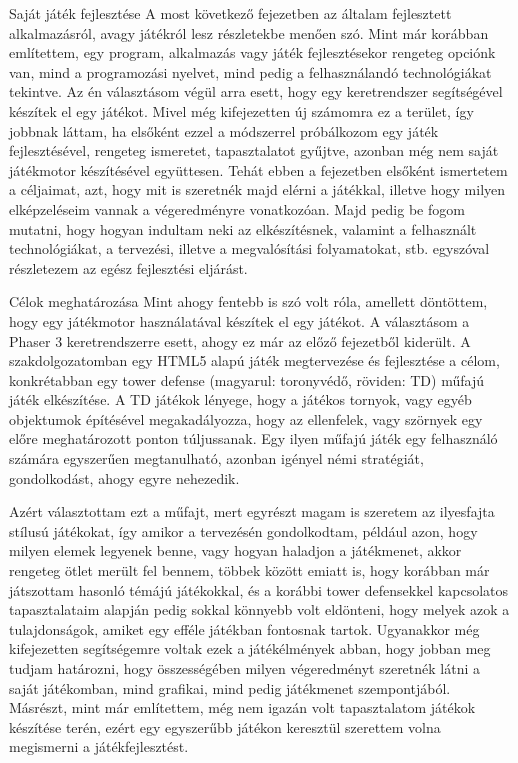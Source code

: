 \begin{MyChapter}{Saját játék fejlesztése}
	A most következő fejezetben az általam fejlesztett alkalmazásról, avagy játékról lesz részletekbe menően szó. Mint már korábban említettem, egy program, alkalmazás vagy játék fejlesztésekor rengeteg opciónk van, mind a programozási nyelvet, mind pedig a felhasználandó technológiákat tekintve. Az én választásom végül arra esett, hogy egy keretrendszer segítségével készítek el egy játékot. Mivel még kifejezetten új számomra ez a terület, így jobbnak láttam, ha elsőként ezzel a módszerrel próbálkozom egy játék fejlesztésével, rengeteg ismeretet, tapasztalatot gyűjtve, azonban még nem saját játékmotor készítésével együttesen.
	Tehát ebben a fejezetben elsőként ismertetem a céljaimat, azt, hogy mit is szeretnék majd elérni a játékkal, illetve hogy milyen elképzeléseim vannak a végeredményre vonatkozóan. Majd pedig be fogom mutatni, hogy hogyan indultam neki az elkészítésnek, valamint a felhasznált technológiákat, a tervezési, illetve a megvalósítási folyamatokat, stb. egyszóval részletezem az egész fejlesztési eljárást.
	
	\begin{MySection}{Célok meghatározása}
		Mint ahogy fentebb is szó volt róla, amellett döntöttem, hogy egy játékmotor használatával készítek el egy játékot. A választásom a Phaser 3 keretrendszerre esett, ahogy ez már az előző fejezetből kiderült.
		A szakdolgozatomban egy HTML5 alapú játék megtervezése és fejlesztése a célom, konkrétabban egy tower defense (magyarul: toronyvédő, röviden: TD) műfajú játék elkészítése. A TD játékok lényege, hogy a játékos tornyok, vagy egyéb objektumok építésével megakadályozza, hogy az ellenfelek, vagy szörnyek egy előre meghatározott ponton túljussanak. Egy ilyen műfajú játék egy felhasználó számára egyszerűen megtanulható, azonban igényel némi stratégiát, gondolkodást, ahogy egyre nehezedik. 
		
		Azért választottam ezt a műfajt, mert egyrészt magam is szeretem az ilyesfajta stílusú játékokat, így amikor a tervezésén gondolkodtam, például azon, hogy milyen elemek legyenek benne, vagy hogyan haladjon a játékmenet, akkor rengeteg ötlet merült fel bennem, többek között emiatt is, hogy korábban már játszottam hasonló témájú játékokkal, és a korábbi tower defensekkel kapcsolatos tapasztalataim alapján pedig sokkal könnyebb volt eldönteni, hogy melyek azok a tulajdonságok, amiket egy efféle játékban fontosnak tartok. Ugyanakkor még kifejezetten segítségemre voltak ezek a játékélmények abban, hogy jobban meg tudjam határozni, hogy összességében milyen végeredményt szeretnék látni a saját játékomban, mind grafikai, mind pedig játékmenet szempontjából. Másrészt, mint már említettem, még nem igazán volt tapasztalatom játékok készítése terén, ezért egy egyszerűbb játékon keresztül szerettem volna megismerni a játékfejlesztést.
		

\end{MySection}
\end{MyChapter}
